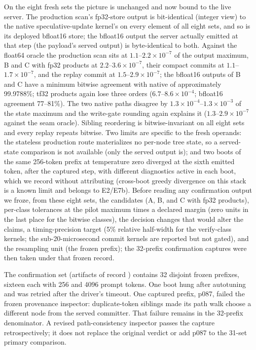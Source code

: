 \documentclass[conference]{IEEEtran}
\begin{document}
On the eight fresh sets the picture is unchanged and now bound to the live server. The production scan's fp32-store output is bit-identical (integer view) to the native speculative-update kernel's on every element of all eight sets, and so is its deployed bfloat16 store; the bfloat16 output the server actually emitted at that step (the payload's served output) is byte-identical to both. Against the float64 oracle the production scan sits at $1.1$--$2.2\times10^{-7}$ of the output maximum, B and C with fp32 products at $2.2$--$3.6\times10^{-7}$, their compact commits at $1.1$--$1.7\times10^{-7}$, and the replay commit at $1.5$--$2.9\times10^{-7}$; the bfloat16 outputs of B and C have a minimum bitwise agreement with native of approximately 99.9788\%; tf32 products again lose three orders ($6.7$--$8.6\times10^{-4}$; bfloat16 agreement 77--81\%). The two native paths disagree by $1.3\times10^{-4}$--$1.3\times10^{-3}$ of the state maximum and the write-gate rounding again explains it ($1.3$--$2.9\times10^{-7}$ against the seam oracle). Sibling reordering is bitwise-invariant on all eight sets and every replay repeats bitwise. Two limits are specific to the fresh operands: the stateless production route materializes no per-node tree state, so a served-state comparison is not available (only the served output is); and two boots of the same 256-token prefix at temperature zero diverged at the sixth emitted token, after the captured step, with different diagnostics active in each boot, which we record without attributing (cross-boot greedy divergence on this stack is a known limit and belongs to E2/E7b). Before reading any confirmation output we froze, from these eight sets, the candidates (A, B, and C with fp32 products), per-class tolerances at the pilot maximum times a declared margin (zero units in the last place for the bitwise classes), the decision changes that would alter the claims, a timing-precision target (5\% relative half-width for the verify-class kernels; the sub-20-microsecond commit kernels are reported but not gated), and the resampling unit (the frozen prefix); the 32-prefix confirmation captures were then taken under that frozen record.

The confirmation set (artifacts of record ) contains 32 disjoint frozen prefixes, sixteen each with 256 and 4096 prompt tokens. One boot hung after autotuning and was retried after the driver's timeout. One captured prefix, p087, failed the frozen provenance inspector: duplicate-token siblings made its path walk choose a different node from the served committer. That failure remains in the 32-prefix denominator. A revised path-consistency inspector passes the capture retrospectively; it does not replace the original verdict or add p087 to the 31-set primary comparison.
\end{document}
